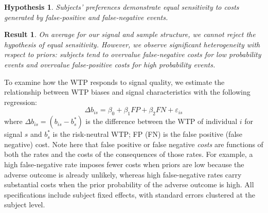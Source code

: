 \documentclass[12pt,a4paper]{article}
\newtheorem{hypothesis}{Hypothesis}
\newtheorem{result}{Result}
\begin{document}





\begin{hypothesis}\label{hyp:eqSen} 
Subjects' preferences demonstrate equal sensitivity to costs generated by false-positive and false-negative events. 
\end{hypothesis}

\begin{result} 
On average for our signal and sample structure, we cannot reject the hypothesis of equal sensitivity. However, we observe significant heterogeneity with respect to priors: subjects tend to overvalue false-negative costs for low probability events and overvalue false-positive costs for high probability events. 
\end{result}


To examine how the WTP responds to signal quality, we estimate the relationship between WTP biases and signal characteristics with the following regression:
\[\Delta b_{is} = \beta_0 + \beta_1 FP + \beta_2 FN + \varepsilon_{is}\]
where $\Delta b_{is} = (b_{is} - b^*_s)$ is the difference between the WTP of individual $i$ for signal $s$ and $b^*_s$ is the risk-neutral WTP; FP (FN) is the false positive (false negative) cost.  Note here that false positive or false negative \textit{costs} are functions of both the rates and the costs of the consequences of those rates.  For example, a high false-negative rate imposes fewer costs when priors are low because the adverse outcome is already unlikely, whereas high false-negative rates carry substantial costs when the prior probability of the adverse outcome is high. All specifications include subject fixed effects, with standard errors clustered at the subject level. 


\end{document}
